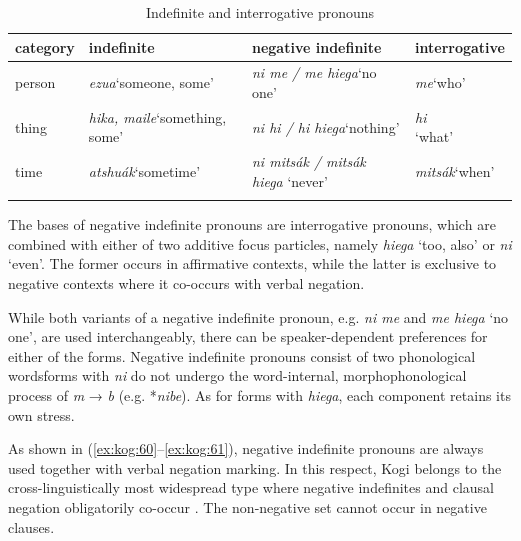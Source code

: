 \documentclass[output=paper,colorlinks,citecolor=brown]{langscibook}
\begin{document}
\begin{table}
\begin{tabularx}{\textwidth}{lQQQ}
    \lsptoprule
    category & indefinite & negative indefinite & interrogative \\
    \midrule
    person & \textit{ezua}\newline ‘someone, some’ & \textit{ni me / me hiega}\newline ‘no one’ & \textit{me}\newline ‘who’ \\
    \tablevspace
    thing & \textit{hika, maile}\newline ‘something, some’ & \textit{ni hi / hi hiega}\newline ‘nothing’ & {\textit{hi}\newline ‘what’} \\
    \tablevspace
    time & \textit{atshuák}\newline ‘sometime’ & \textit{ni mitsák / mitsák hiega}  ‘never’ & \textit{mitsák}\newline ‘when’ \\
    \lspbottomrule
\end{tabularx}
\caption{Indefinite and interrogative pronouns}
\label{tab:kog:6}
\end{table}


\largerpage
The bases of negative indefinite pronouns are interrogative pronouns, which are combined with either of two additive focus particles, namely \textit{hiega} ‘too, also’ or \textit{ni} ‘even’. The former occurs in affirmative contexts, while the latter is exclusive to negative contexts where it co-occurs with verbal negation.

While both variants of a negative indefinite pronoun, e.g. \textit{ni me} and \textit{me hiega} ‘no one’, are used interchangeably, there can be speaker-dependent preferences for either of the forms. Negative indefinite pronouns consist of two phonological words\textemdash forms with \textit{ni} do not undergo the word-internal, morphophonological process of \textit{m} → \textit{b} (e.g. *\textit{nibe}). As for forms with \textit{hiega}, each component retains its own stress.

As shown in (\ref{ex:kog:60}--\ref{ex:kog:61}), negative indefinite pronouns are always used together with verbal negation marking. In this respect, Kogi belongs to the cross-linguistically most widespread type where negative indefinites and clausal negation obligatorily co-occur \citep[202]{Haspelmath1997}. The non-negative set cannot occur in negative clauses.
\end{document}
